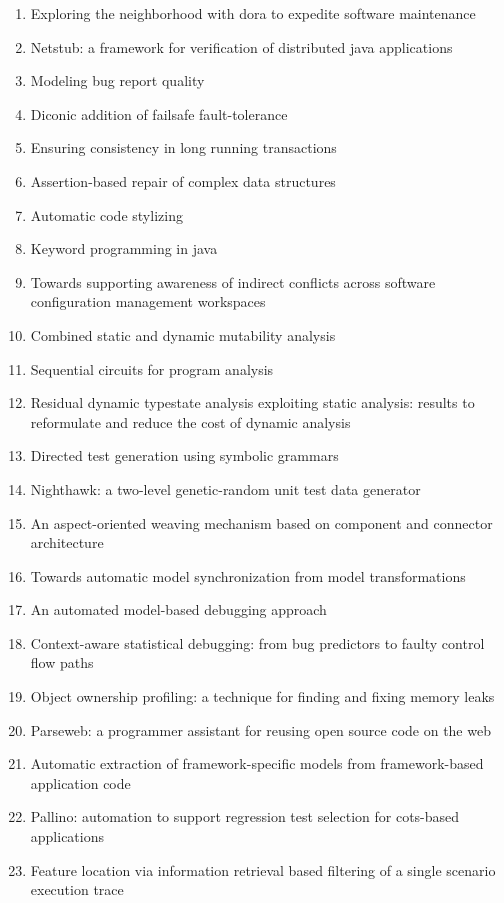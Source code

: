 \begin{enumerate}[itemsep=-1ex]
  \item Exploring the neighborhood with dora to expedite software maintenance
  \item Netstub: a framework for verification of distributed java applications
  \item Modeling bug report quality
  \item Diconic addition of failsafe fault-tolerance
  \item Ensuring consistency in long running transactions
  \item Assertion-based repair of complex data structures
  \item Automatic code stylizing
  \item Keyword programming in java
  \item Towards supporting awareness of indirect conflicts across software configuration management workspaces
  \item Combined static and dynamic mutability analysis
  \item Sequential circuits for program analysis
  \item Residual dynamic typestate analysis exploiting static analysis: results to reformulate and reduce the cost of dynamic analysis
  \item Directed test generation using symbolic grammars
  \item Nighthawk: a two-level genetic-random unit test data generator
  \item An aspect-oriented weaving mechanism based on component and connector architecture
  \item Towards automatic model synchronization from model transformations
  \item An automated model-based debugging approach
  \item Context-aware statistical debugging: from bug predictors to faulty control flow paths
  \item Object ownership profiling: a technique for finding and fixing memory leaks
  \item Parseweb: a programmer assistant for reusing open source code on the web
  \item Automatic extraction of framework-specific models from framework-based application code
  \item Pallino: automation to support regression test selection for cots-based applications
  \item Feature location via information retrieval based filtering of a single scenario execution trace

\end{enumerate}
